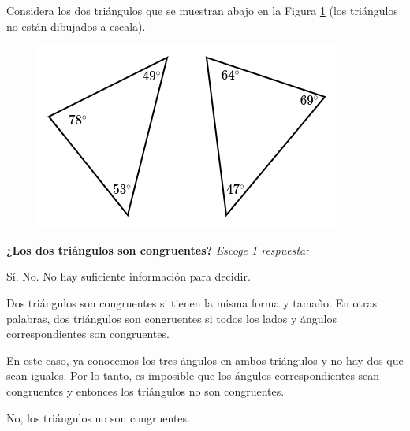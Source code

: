 \question[5] Considera los dos triángulos que se muestran abajo en la Figura \ref{fig:20230323153911} (los triángulos no están dibujados a escala).

\begin{figure}[H]
    \includegraphics[width=0.5\linewidth]{../images/20230323153911}
    \caption{}
    \label{fig:20230323153911}
\end{figure}

\textbf{¿Los dos triángulos son congruentes?}
\emph{Escoge 1 respuesta:}

\begin{choices}
    \choice Sí.
    \CorrectChoice No.
    \choice No hay suficiente información para decidir.
\end{choices}

\begin{solutionbox}{5cm}
    Dos triángulos son congruentes si tienen la misma forma y tamaño. En otras palabras, dos triángulos son congruentes si todos los lados y ángulos correspondientes son congruentes.

    En este caso, ya conocemos los tres ángulos en ambos triángulos y no hay dos que sean iguales.
    Por lo tanto, es imposible que los ángulos correspondientes sean congruentes y entonces los triángulos no son congruentes.

    No, los triángulos no son congruentes.
\end{solutionbox}